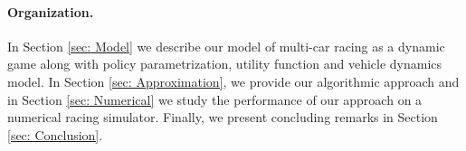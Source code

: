 \paragraph{Organization.}
In Section \ref{sec: Model} we describe our model of multi-car racing as a dynamic game along with policy parametrization, utility function and vehicle dynamics model. In Section \ref{sec: Approximation}, we provide our algorithmic approach and in Section \ref{sec: Numerical} we study the performance of our approach on a numerical racing simulator. Finally, we present concluding remarks in Section \ref{sec: Conclusion}. 
























